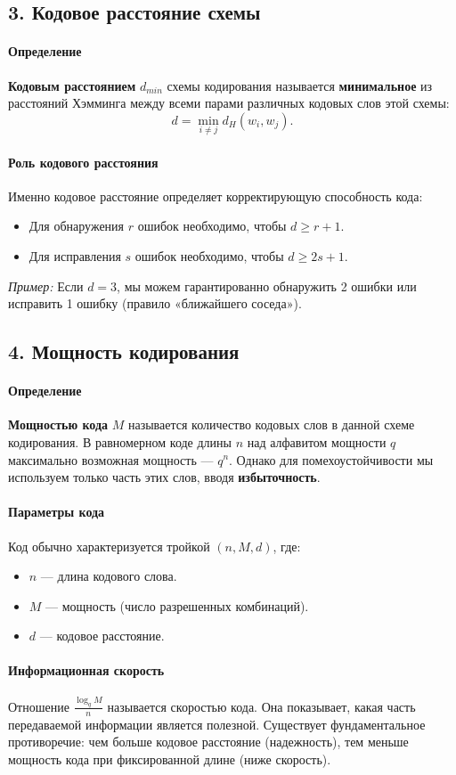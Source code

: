 \subsection*{3. Кодовое расстояние схемы}

\paragraph{Определение}
\textbf{Кодовым расстоянием} $d_{min}$ схемы кодирования называется \textbf{минимальное} из расстояний Хэмминга между всеми парами различных кодовых слов этой схемы:
$$d = \min_{i \neq j} d_H(w_i, w_j).$$

\paragraph{Роль кодового расстояния}
Именно кодовое расстояние определяет корректирующую способность кода:
\begin{itemize}
    \item Для обнаружения $r$ ошибок необходимо, чтобы $d \ge r + 1$.
    \item Для исправления $s$ ошибок необходимо, чтобы $d \ge 2s + 1$.
\end{itemize}
\textit{Пример:} Если $d=3$, мы можем гарантированно обнаружить 2 ошибки или исправить 1 ошибку (правило «ближайшего соседа»).

\subsection*{4. Мощность кодирования}

\paragraph{Определение}
\textbf{Мощностью кода} $M$ называется количество кодовых слов в данной схеме кодирования.
В равномерном коде длины $n$ над алфавитом мощности $q$ максимально возможная мощность — $q^n$. Однако для помехоустойчивости мы используем только часть этих слов, вводя \textbf{избыточность}.

\paragraph{Параметры кода}
Код обычно характеризуется тройкой $(n, M, d)$, где:
\begin{itemize}
    \item $n$ — длина кодового слова.
    \item $M$ — мощность (число разрешенных комбинаций).
    \item $d$ — кодовое расстояние.
\end{itemize}

\paragraph{Информационная скорость}
Отношение $\frac{\log_q M}{n}$ называется скоростью кода. Она показывает, какая часть передаваемой информации является полезной. Существует фундаментальное противоречие: чем больше кодовое расстояние (надежность), тем меньше мощность кода при фиксированной длине (ниже скорость).